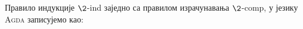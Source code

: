 Правило индукције $\2$-ind заједно са правилом израчунавања $\2$-comp, у језику \textsc{Agda} записујемо као:
\begin{code}%
\>[0]%
\>[2249I]\AgdaSymbol{:}\AgdaSpace{}%
\AgdaSymbol{(}\AgdaSpace{}%
\AgdaSymbol{:}\AgdaSpace{}%
\AgdaSpace{}%
\AgdaSpace{}%
\AgdaSpace{}%
\AgdaSpace{}%
\AgdaSymbol{)}\<%
\\
\>[.][@{}l@{}]\<[2249I]%
\>[12]\AgdaSpace{}%
\AgdaSymbol{(}\AgdaSpace{}%
\AgdaSymbol{)}\<%
\\
%
\>[12]\AgdaSpace{}%
\AgdaSymbol{(}\AgdaSpace{}%
\AgdaSymbol{)}\<%
\\
%
\>[12]\AgdaSpace{}%
\AgdaSymbol{(}\AgdaSpace{}%
\AgdaSymbol{:}\AgdaSpace{}%
\AgdaSymbol{)}\AgdaSpace{}%
\AgdaSpace{}%
\AgdaSymbol{(}\AgdaSpace{}%
\AgdaSymbol{)}\<%
\\
\>[0]\AgdaSpace{}%
\AgdaSpace{}%
\AgdaSpace{}%
\AgdaSpace{}%
%
\>[26]\AgdaSymbol{=}\AgdaSpace{}%
\<%
\\
\>[0]\AgdaSpace{}%
\AgdaSpace{}%
\AgdaSpace{}%
\AgdaSpace{}%
\AgdaSpace{}%
\AgdaSymbol{=}\AgdaSpace{}%
\<%
\end{code}

